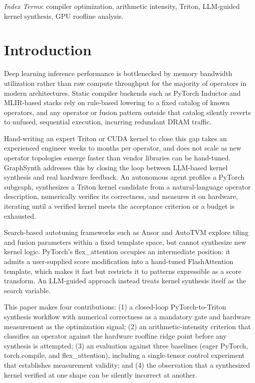 \documentclass[10pt,twocolumn]{article}
\newcommand{\tc}{torch.compile}
\newcommand{\fx}{flex\_attention}
\begin{document}
\vspace{4pt}
\noindent\textit{Index Terms}: compiler optimization, arithmetic intensity, Triton,
LLM-guided kernel synthesis, GPU roofline analysis.

\section{Introduction}

Deep learning inference performance is bottlenecked by memory bandwidth utilization
rather than raw compute throughput for the majority of operators in modern
architectures. Static compiler backends such as PyTorch Inductor and MLIR-based stacks
rely on rule-based lowering to a fixed catalog of known operators, and any operator or
fusion pattern outside that catalog silently reverts to unfused, sequential execution,
incurring redundant DRAM traffic.

Hand-writing an expert Triton or CUDA kernel to close this gap takes an experienced
engineer weeks to months per operator, and does not scale as new operator topologies
emerge faster than vendor libraries can be hand-tuned. GraphSynth addresses this by
closing the loop between LLM-based kernel synthesis and real hardware feedback. An
autonomous agent profiles a PyTorch subgraph, synthesizes a Triton kernel candidate
from a natural-language operator description, numerically verifies its correctness, and
measures it on hardware, iterating until a verified kernel meets the acceptance
criterion or a budget is exhausted.

Search-based autotuning frameworks such as Ansor and AutoTVM explore tiling and fusion
parameters within a fixed template space, but cannot synthesize new kernel logic.
PyTorch's \fx{} occupies an intermediate position: it admits a user-supplied score
modification into a hand-tuned FlashAttention template, which makes it fast but
restricts it to patterns expressible as a score transform. An LLM-guided approach
instead treats kernel synthesis itself as the search variable.

This paper makes four contributions: (1) a closed-loop PyTorch-to-Triton synthesis
workflow with numerical correctness as a mandatory gate and hardware measurement as the
optimization signal; (2) an arithmetic-intensity criterion that classifies an operator
against the hardware roofline ridge point before any synthesis is attempted; (3) an
evaluation against three baselines (eager PyTorch, \tc{}, and \fx{}), including a
single-tensor control experiment that establishes measurement validity; and (4) the
observation that a synthesized kernel verified at one shape can be silently incorrect
at another.
\end{document}

